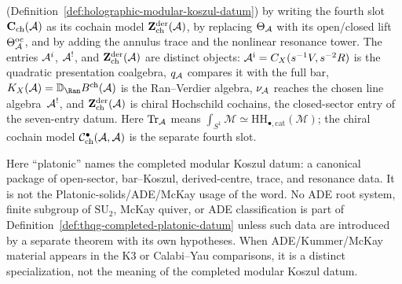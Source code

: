 \begin{definition}
(Definition~\ref{def:holographic-modular-koszul-datum})
by writing the fourth slot
$\mathbf{C}_{\mathrm{ch}}(\mathcal{A})$ as its cochain model
$\mathbf{Z}^{\mathrm{der}}_{\mathrm{ch}}(\mathcal{A})$, by replacing
$\Theta_{\mathcal{A}}$ with its open/closed lift
$\Theta^{\mathrm{oc}}_{\mathcal{A}}$, and by adding the annulus trace and the
nonlinear resonance tower. The entries $\mathcal{A}^i$, $\mathcal{A}^!$, and
$\mathbf{Z}^{\mathrm{der}}_{\mathrm{ch}}(\mathcal{A})$ are distinct objects:
$\mathcal{A}^{\mathrm i}=C_X(s^{-1}V,s^{-2}R)$ is the quadratic presentation
coalgebra, $q_{\mathcal{A}}$ compares it with the full bar,
$K_X(\cA)=\mathbb D_{\Ran}B^{\mathrm{ch}}(\cA)$ is the Ran--Verdier
algebra, $\nu_{\mathcal{A}}$ reaches the chosen line algebra~$\mathcal{A}^!$, and
$\mathbf{Z}^{\mathrm{der}}_{\mathrm{ch}}(\mathcal{A})$ is chiral Hochschild
cochains, the closed-sector entry of the seven-entry datum.
Here $\operatorname{Tr}_{\mathcal{A}}$ means
$\int_{S^1}\mathcal M\simeq
\mathrm{HH}_{\bullet,\mathrm{cat}}(\mathcal M)$; the chiral cochain
model $\mathcal{C}^{\bullet}_{\mathrm{ch}}(\mathcal{A},\mathcal{A})$ is the separate
fourth slot.
\end{definition}

\begin{remark}
\label{rem:thqg-platonic-terminology}
Here ``platonic'' names the completed modular Koszul datum: a canonical
package of open-sector,
bar--Koszul, derived-centre, trace, and resonance data. It is not the
Platonic-solids/ADE/McKay usage of the word. No ADE root system,
finite subgroup of $\mathrm{SU}_2$, McKay quiver, or ADE
classification is part of Definition~\ref{def:thqg-completed-platonic-datum}
unless such data are introduced by a separate theorem with its own
hypotheses. When ADE/Kummer/McKay material appears in the K3 or
Calabi--Yau comparisons, it is a distinct specialization, not the
meaning of the completed modular Koszul datum.
\end{remark}

